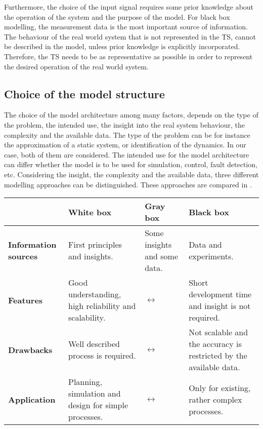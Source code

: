 Furthermore, the choice of the input signal requires some prior knowledge about the operation of the system and the purpose of the model. For black box modelling, the measurement data is the most important source of information. The behaviour of the real world system that is not represented in the TS, cannot be described in the model, unless prior knowledge is explicitly incorporated. Therefore, the TS needs to be as representative as possible in order to represent the desired operation of the real world system. 
\vspace{-3mm}
\subsection{Choice of the model structure}
\label{choice_of_the_model_architecture}

The choice of the model architecture among many factors, depends on the type of the problem, the intended use, the insight into the real system behaviour, the complexity and the available data. The type of the problem can be for instance the approximation of a static system, or identification of the dynamics. In our case, both of them are considered. The intended use for the model architecture can differ whether the model is to be used for simulation, control, fault detection, etc. Considering the insight, the complexity and the available data, three different modelling approaches can be distinguished\cite{nelles2013nonlinear}. These approaches are compared in . 

\vspace{-3mm}

\begin{center}
    \begin{tabular}{ | >{\centering\arraybackslash}m{1.8cm} | >{\centering\arraybackslash}m{3.6cm} | >{\centering\arraybackslash}m{3.6cm} | >{\centering\arraybackslash}m{3.6cm} |}
    \hline
    \multirow{1}{*}
     & \textbf{White box} & \textbf{Gray box} & \textbf{Black box} \\ 
     \hline
     \multirow{1}{*}
    \textbf{Information sources} & First principles and insights. &  Some insights and some data. & Data and experiments.\\ 
    \hline
      \multirow{1}{*}
    \textbf{Features} & Good understanding, high reliability and scalability. & $\longleftrightarrow$  & Short development time and insight is not required.\\ 
    \hline
      \multirow{1}{*}
    \textbf{Drawbacks} & Well described process is required. & $\longleftrightarrow$ & Not scalable and the accuracy is restricted by the available data.\\ 
    \hline
          \multirow{1}{*}
    \textbf{Application} & Planning, simulation and design for simple processes. & $\longleftrightarrow$ & Only for existing, rather complex processes.\\ 
    \hline
    \end{tabular}
    \label{comparisontable_sysid}
\end{center}

